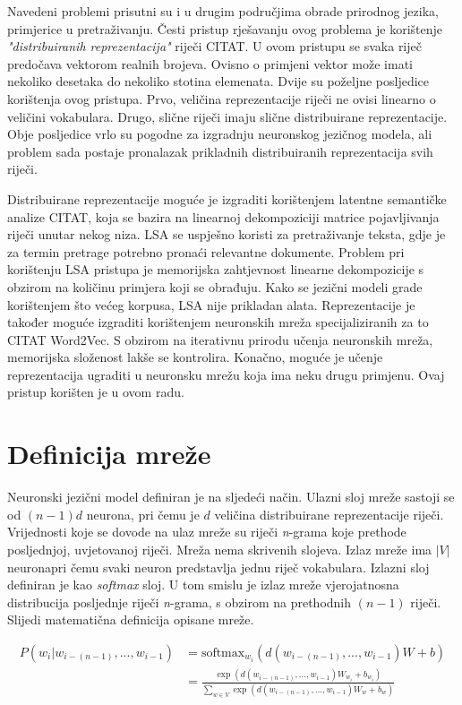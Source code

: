 \documentclass[times, utf8, diplomski, numeric]{fer}
\begin{document}
Navedeni problemi prisutni su i u drugim područjima obrade prirodnog jezika, primjerice u pretraživanju. Česti pristup rješavanju ovog problema je korištenje \textit{"distribuiranih reprezentacija"} riječi CITAT. U ovom pristupu se svaka riječ predočava vektorom realnih brojeva. Ovisno o primjeni vektor može imati nekoliko desetaka do nekoliko stotina elemenata. Dvije su poželjne posljedice korištenja ovog pristupa. Prvo, veličina reprezentacije riječi ne ovisi linearno o veličini vokabulara. Drugo, slične riječi imaju slične distribuirane reprezentacije. Obje posljedice vrlo su pogodne za izgradnju neuronskog jezičnog modela, ali problem sada postaje pronalazak prikladnih distribuiranih reprezentacija svih riječi.

Distribuirane reprezentacije moguće je izgraditi korištenjem latentne semantičke analize CITAT, koja se bazira na linearnoj dekompoziciji matrice pojavljivanja riječi unutar nekog niza. LSA se uspješno koristi za pretraživanje teksta, gdje je za termin pretrage potrebno pronaći relevantne dokumente. Problem pri korištenju LSA pristupa je memorijska zahtjevnost linearne dekompozicije s obzirom na količinu primjera koji se obrađuju. Kako se jezični modeli grade korištenjem što većeg korpusa, LSA nije prikladan alata. Reprezentacije je također moguće izgraditi korištenjem neuronskih mreža specijaliziranih za to CITAT Word2Vec. S obzirom na iterativnu prirodu učenja neuronskih mreža, memorijska složenost lakše se kontrolira. Konačno, moguće je učenje reprezentacija ugraditi u neuronsku mrežu koja ima neku drugu primjenu. Ovaj pristup korišten je u ovom radu.

\section{Definicija mreže}

Neuronski jezični model definiran je na sljedeći način. Ulazni sloj mreže sastoji se od $(n - 1) d$ neurona, pri čemu je $d$ veličina distribuirane reprezentacije riječi. Vrijednosti koje se dovode na ulaz mreže su riječi \textit{n}-grama koje prethode posljednjoj, uvjetovanoj riječi. Mreža nema skrivenih slojeva. Izlaz mreže ima $|V|$ neuronapri čemu svaki neuron predstavlja jednu riječ vokabulara. Izlazni sloj definiran je kao \textit{softmax} sloj. U tom smislu je izlaz mreže vjerojatnosna distribucija posljednje riječi \textit{n}-grama, s obzirom na prethodnih $(n - 1)$ riječi. Slijedi matematična definicija opisane mreže.

\begin{equation}
\label{eq:lnnet}
\begin{split}
P(w_i | w_{i - (n - 1)}, ... , w_{i - 1}) 
  & = \text{softmax}_{w_i}(d(w_{i - (n - 1)}, ... , w_{i - 1}) W + b) \\
  & = \frac{\exp(d(w_{i - (n - 1)}, ... , w_{i - 1}) W_{w_i} + b_{w_i})}
           {\sum_{w \in V} \exp(d(w_{i - (n - 1)}, ... , w_{i - 1}) W_{w} + b_{w})}
\end{split}
\end{equation}
\end{document}
